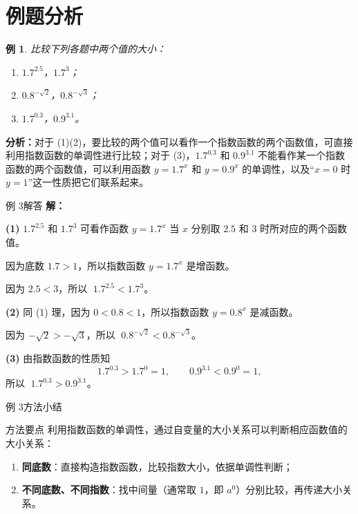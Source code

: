 \documentclass[aspectratio=169,11pt,t,fleqn]{ctexbeamer}
\newtheorem{instance}{例}%
\begin{document}
\section{例题分析}
\begin{frame}{}
  \begin{instance}
    比较下列各题中两个值的大小：
    \begin{enumerate}[(\arabic*)]
      \item $1.7^{2.5}$，$1.7^{3}$；
      \item $0.8^{-\sqrt{2}}$，$0.8^{-\sqrt{3}}$；
      \item $1.7^{0.3}$，$0.9^{3.1}$。
    \end{enumerate}
  \end{instance}

  \vspace{0.3em}
  \small\textbf{分析：}对于 (1)(2)，要比较的两个值可以看作一个指数函数的两个函数值，可直接利用指数函数的单调性进行比较；对于 (3)，$1.7^{0.3}$ 和 $0.9^{3.1}$ 不能看作某一个指数函数的两个函数值，可以利用函数 $y=1.7^x$ 和 $y=0.9^x$ 的单调性，以及“$x=0$ 时 $y=1$”这一性质把它们联系起来。
\end{frame}

\begin{frame}{例 3\quad 解答}
  \small
  \textbf{解：}

  \textbf{(1)} $1.7^{2.5}$ 和 $1.7^{3}$ 可看作函数 $y=1.7^x$ 当 $x$ 分别取 $2.5$ 和 $3$ 时所对应的两个函数值。

  因为底数 $1.7>1$，所以指数函数 $y=1.7^x$ 是\alert{增函数}。

  因为 $2.5<3$，所以 $\;1.7^{2.5}<1.7^{3}$。

  \vspace{0.6em}
  \textbf{(2)} 同 (1) 理，因为 $0<0.8<1$，所以指数函数 $y=0.8^x$ 是\alert{减函数}。

  因为 $-\sqrt{2}>-\sqrt{3}$，所以 $\;0.8^{-\sqrt{2}}<0.8^{-\sqrt{3}}$。

  \vspace{0.6em}
  \textbf{(3)} 由指数函数的性质知
  \[
    1.7^{0.3}>1.7^{0}=1,\qquad
    0.9^{3.1}<0.9^{0}=1,
  \]
  所以 $\;1.7^{0.3}>0.9^{3.1}$。
\end{frame}

\begin{frame}{例 3\quad 方法小结}
  \begin{alertblock}{方法要点}
    利用指数函数的单调性，通过自变量的大小关系可以判断相应函数值的大小关系：
  \end{alertblock}

  \begin{enumerate}[(1)]
    \item \textbf{同底数}：直接构造指数函数，比较指数大小，依据单调性判断；
    \item \textbf{不同底数、不同指数}：找中间量（通常取 $1$，即 $a^0$）分别比较，再传递大小关系。
  \end{enumerate}
\end{frame}
\end{document}
